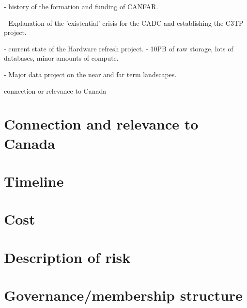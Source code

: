 \documentclass[11pt]{article}
\begin{document}
 - history of the formation  and funding of CANFAR.

 - Explanation of the 'existential' crisis for the CADC and establishing the C3TP project.

 - current state of the Hardware refresh project.  - 10PB of raw storage, lots of databases, minor amounts of compute.  

 -  Major data project on the near and far term landscapes.



connection or relevance to Canada

\section{Connection and relevance to Canada}
\section{Timeline}
\section{Cost}
\section{Description of risk}
\section{Governance/membership structure}







\end{document}
